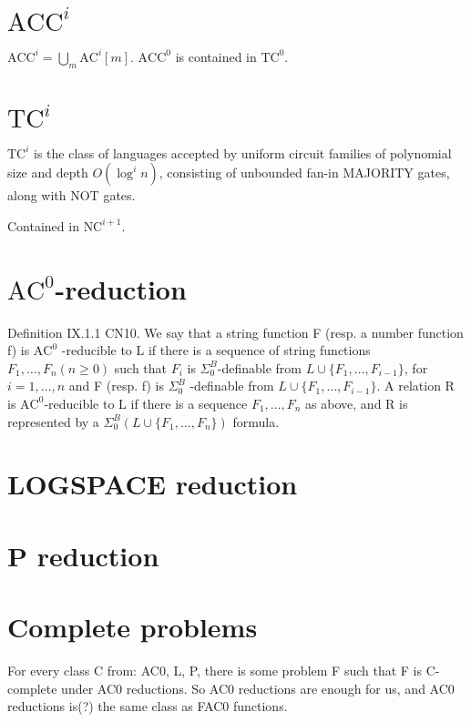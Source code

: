 \section{\texorpdfstring{$\text{ACC}^i$}{ACC\string^i}}
$\text{ACC}^i = \bigcup_m \text{AC}^i[m]$. $\text{ACC}^0$ is contained in $\text{TC}^0$.

\section{\texorpdfstring{$\text{TC}^i$}{TC\string^i}}
$\text{TC}^i$ is the class of languages accepted by uniform circuit families 
of polynomial size and depth $O(\log^i n)$, consisting of unbounded fan-in MAJORITY
gates, along with NOT gates.

Contained in $\text{NC}^{i + 1}$.

\section{\texorpdfstring{$\text{AC}^0$-reduction}{AC\string^0-reduction}}
\label{sec:ac0red}
Definition IX.1.1 CN10. We say that a string function F
(resp. a number function f) is $\text{AC}^0$ -reducible to L if there is a sequence
of string functions $F_1, \dots, F_n (n \geqslant 0)$ such that
$F_i$ is $\Sigma^B_0$-definable from $L \cup \{F_1, \dots , F_{i-1}\}$, for $i = 1, \dots, n$
and F (resp. f) is $\Sigma^B_0$ -definable from $L \cup \{F_1, \dots , F_{i-1}\}$. A relation R is
$\text{AC}^0$-reducible to L if there is a sequence $F_1, \dots, F_n$ as above, and R is
represented by a $\Sigma^B_0(L \cup \{F_1, \dots, F_n\})$ formula.

\section{LOGSPACE reduction}

\section{P reduction}

\section{Complete problems}
\label{sec:complete-problems}
For every class C from: AC0, L, P, there is some problem F such that F is C-complete under AC0 reductions.
So AC0 reductions are enough for us, and AC0 reductions is(?) the same class as FAC0 functions.
